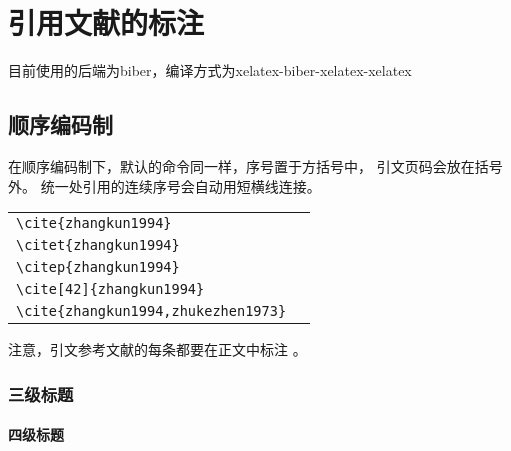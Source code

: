 \chapter{引用文献的标注}

  目前使用的后端为biber，编译方式为xelatex-biber-xelatex-xelatex
  
  
  \section{顺序编码制}
  
  在顺序编码制下，默认的命令同一样，序号置于方括号中，
  引文页码会放在括号外。
  统一处引用的连续序号会自动用短横线连接。
  
  \begin{tabular}{l@{\quad$\Rightarrow$\quad}l}
    \verb|\cite{zhangkun1994}|               & \cite{zhangkun1994}               \\
    \verb|\citet{zhangkun1994}|              & \citet{zhangkun1994}              \\
    \verb|\citep{zhangkun1994}|              & \citep{zhangkun1994}              \\
    \verb|\cite[42]{zhangkun1994}|           & \cite[42]{zhangkun1994}           \\
    \verb|\cite{zhangkun1994,zhukezhen1973}| & \cite{zhangkun1994,zhukezhen1973} \\
  \end{tabular}


  注意，引文参考文献的每条都要在正文中标注
  \cite{zhangkun1994,zhukezhen1973,dupont1974bone,zhengkaiqing1987,%
    jiangxizhou1980,jianduju1994,merkt1995rotational,mellinger1996laser,%
    bixon1996dynamics,mahui1995,carlson1981two,taylor1983scanning,%
    taylor1981study,shimizu1983laser,atkinson1982experimental,%
    kusch1975perturbations,guangxi1993,huosini1989guwu,wangfuzhi1865songlun,%
    zhaoyaodong1998xinshidai,biaozhunhua2002tushu,chubanzhuanye2004,%
    who1970factors,peebles2001probability,baishunong1998zhiwu,%
    weinstein1974pathogenic,hanjiren1985lun,dizhi1936dizhi,%
    tushuguan1957tushuguanxue,aaas1883science,fugang2000fengsha,%
    xiaoyu2001chubanye,oclc2000about,scitor2000project%
  }。

  \subsection{三级标题}

  \subsubsection{四级标题}